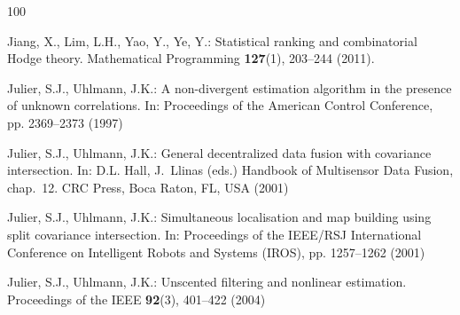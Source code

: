 \documentclass[graybox,envcountchap]{style/SNmono}
\begin{document}
\begin{thebibliography}{100}

Jiang, X., Lim, L.H., Yao, Y., Ye, Y.: Statistical ranking and combinatorial
  {Hodge} theory.
\newblock Mathematical Programming \textbf{127}(1), 203--244 (2011).
\newblock {}


{\color{red} 
Julier, S.J., Uhlmann, J.K.: A non-divergent estimation algorithm in the
  presence of unknown correlations.
\newblock In: Proceedings of the American Control Conference, pp. 2369--2373
  (1997)

\par}
{\color{red} 
Julier, S.J., Uhlmann, J.K.: General decentralized data fusion with covariance
  intersection.
\newblock In: D.L. Hall, J.~Llinas (eds.) Handbook of Multisensor Data Fusion,
  chap.~12. CRC Press, Boca Raton, FL, USA (2001)

\par}
{\color{red} 
Julier, S.J., Uhlmann, J.K.: Simultaneous localisation and map building using
  split covariance intersection.
\newblock In: Proceedings of the IEEE/RSJ International Conference on
  Intelligent Robots and Systems (IROS), pp. 1257--1262 (2001)

\par}
{\color{red} 
Julier, S.J., Uhlmann, J.K.: Unscented filtering and nonlinear estimation.
\newblock Proceedings of the IEEE \textbf{92}(3), 401--422 (2004)

}
\end{thebibliography}
\end{document}
